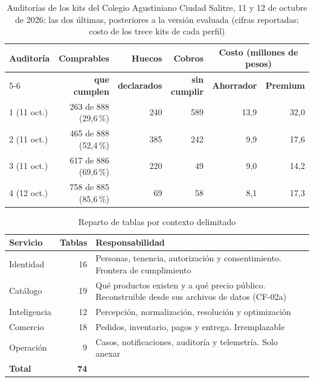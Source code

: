 

\fi

\begin{table}[htbp]
\centering
\caption[Auditorías de los kits del Colegio Agustiniano Ciudad Salitre]{Auditorías de los kits del Colegio Agustiniano Ciudad Salitre, 11 y 12 de octubre de
2026; las dos últimas, posteriores a la versión evaluada (cifras reportadas; costo de los trece kits de cada perfil)}
\label{tab:kits}
\small
\begin{tabular}{@{}lrrrrr@{}}
\toprule
\textbf{Auditoría} & \textbf{Comprables} & \textbf{Huecos} & \textbf{Cobros} &
\multicolumn{2}{c}{\textbf{Costo (millones de pesos)}} \\
\cmidrule(l){5-6}
 & \textbf{que cumplen} & \textbf{declarados} & \textbf{sin cumplir} & \textbf{Ahorrador} &
\textbf{Premium} \\
\midrule
1 (11 oct.) & 263 de 888 (29,6\,\%) & 240 & 589 & 13,9 & 32,0 \\
2 (11 oct.) & 465 de 888 (52,4\,\%) & 385 & 242 & 9,9 & 17,6 \\
3 (11 oct.) & 617 de 886 (69,6\,\%) & 220 & 49 & 9,0 & 14,2 \\
4 (12 oct.) & 758 de 885 (85,6\,\%) & 69 & 58 & 8,1 & 17,3 \\
\bottomrule
\end{tabular}
\end{table}

\begin{table}[htbp]
\centering
\caption{Reparto de tablas por contexto delimitado}
\label{tab:reparto}
\small
\begin{tabular}{@{}lrp{8.4cm}@{}}
\toprule
\textbf{Servicio} & \textbf{Tablas} & \textbf{Responsabilidad} \\
\midrule
Identidad     & 16 & Personas, tenencia, autorización y consentimiento. Frontera de cumplimiento \\
Catálogo      & 19 & Qué productos existen y a qué precio público. Reconstruible desde sus archivos de datos (CF-02a) \\
Inteligencia  & 12 & Percepción, normalización, resolución y optimización \\
Comercio      & 18 & Pedidos, inventario, pagos y entrega. Irremplazable \\
Operación     & 9  & Casos, notificaciones, auditoría y telemetría. Solo anexar \\
\midrule
\textbf{Total} & \textbf{74} & \\
\bottomrule
\end{tabular}
\end{table}

